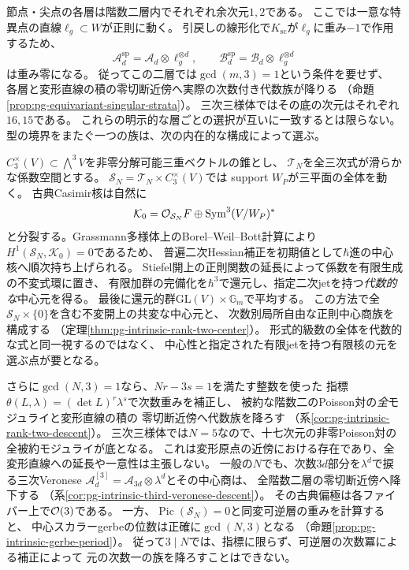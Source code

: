 節点・尖点の各層は階数二層内でそれぞれ余次元$1,2$である。
ここでは一意な特異点の直線$\ell_g\subset W$が正則に動く。
引戻しの線形化で$K_{\mathrm{sc}}$が$\ell_g$に重み$-1$で作用するため、
\begin{equation}\label{eq:intro-singular-point-descent}
 \mathcal A_d^{\mathrm{sp}}=\mathcal A_d\otimes\ell_g^{\otimes d},
 \qquad
 \mathcal B_d^{\mathrm{sp}}=\mathcal B_d\otimes\ell_g^{\otimes d}
\end{equation}
は重み零になる。
従ってこの二層では$\gcd(m,3)=1$という条件を要せず、
各層と変形直線の積の零切断近傍へ実際の次数付き代数族が降りる
（命題\ref{prop:pg-equivariant-singular-strata}）。
三次三様体ではその底の次元はそれぞれ$16,15$である。
これらの明示的な層ごとの選択が互いに一致するとは限らない。
型の境界をまたぐ一つの族は、次の内在的な構成によって選ぶ。

$C_3^\times(V)\subset\bigwedge^3V$を非零分解可能三重ベクトルの錐とし、
$\mathcal T_N$を全三次式が滑らかな係数空間とする。
$\mathcal S_N=\mathcal T_N\times C_3^\times(V)$では
support $W_P$が三平面の全体を動く。
古典Casimir核は自然に
\begin{equation}\label{eq:intro-intrinsic-classical-kernel}
 \mathcal K_0=\mathcal O_{\mathcal S_N}F\oplus
 \operatorname{Sym}^3(V/W_P)^*
\end{equation}
と分裂する。Grassmann多様体上のBorel--Weil--Bott計算により
$H^1(\mathcal S_N,\mathcal K_0)=0$であるため、
普遍二次Hessian補正を初期値として$\hbar$進の中心核へ順次持ち上げられる。
Stiefel開上の正則関数の延長によって係数を有限生成の不変式環に置き、
有限加群の完備化を$\hbar^3$で還元し、指定二次jetを持つ\emph{代数的な}中心元を得る。
最後に還元的群$\mathrm{GL}(V)\times\mathbb G_m$で平均する。
この方法で全$\mathcal S_N\times\{0\}$を含む不変開上の共変な中心元と、
次数別局所自由な正則中心商族を構成する
（定理\ref{thm:pg-intrinsic-rank-two-center}）。
形式的級数の全体を代数的な式と同一視するのではなく、
中心性と指定された有限jetを持つ有限核の元を選ぶ点が要となる。

さらに$\gcd(N,3)=1$なら、$Nr-3s=1$を満たす整数を使った
指標$\theta(L,\lambda)=(\det L)^r\lambda^s$で次数重みを補正し、
被約な階数二のPoisson対の\emph{全}モジュライと変形直線の積の
零切断近傍へ代数族を降ろす
（系\ref{cor:pg-intrinsic-rank-two-descent}）。
三次三様体では$N=5$なので、十七次元の非零Poisson対の全被約モジュライが底となる。
これは変形原点の近傍における存在であり、全変形直線への延長や一意性は主張しない。
一般の$N$でも、次数$3d$部分を$\lambda^d$で捩る三次Veronese
$\mathcal A^{[3]}_d=\mathcal A_{3d}\otimes\lambda^d$とその中心商は、
全階数二層の零切断近傍へ降下する
（系\ref{cor:pg-intrinsic-third-veronese-descent}）。
その古典偏極は各ファイバー上で$\mathcal O(3)$である。
一方、$\operatorname{Pic}(\mathcal S_N)=0$と同変可逆層の重みを計算すると、
中心スカラーgerbeの位数は正確に$\gcd(N,3)$となる
（命題\ref{prop:pg-intrinsic-gerbe-period}）。
従って$3\mid N$では、指標に限らず、可逆層の次数冪による補正によって
元の次数一の族を降ろすことはできない。

